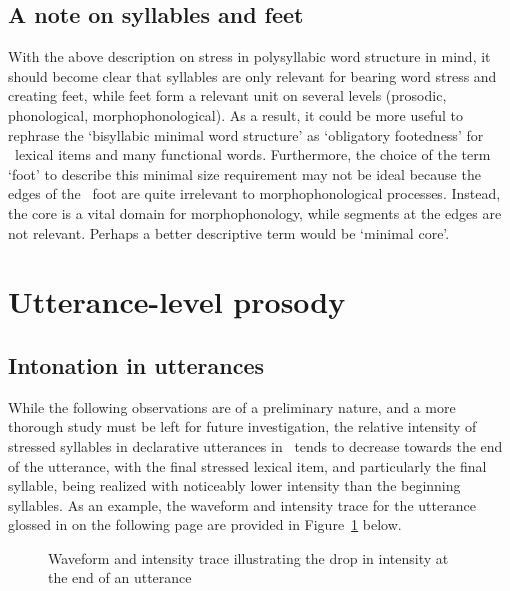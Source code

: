 \subsection{A note on syllables and feet}\label{footedness}
With the above description on stress in polysyllabic word structure in mind, it should become clear that syllables are only relevant for bearing word stress and creating feet, while feet form a relevant unit on several levels (prosodic, phonological, morphophonological). As a result, it could be more useful to rephrase the ‘bisyllabic minimal word structure’ as ‘obligatory footedness’ for \PS\ lexical items and many functional words. Furthermore, the choice of the term ‘foot’ to describe this minimal size requirement may not be ideal because the edges of the \PS\ foot are quite irrelevant to morphophonological processes. Instead, the  core is a vital domain for morphophonology, while segments at the edges are not relevant. Perhaps a better descriptive term would be ‘minimal core’.


\section{Utterance-level prosody}\label{utteranceProsody}

\subsection{Intonation in utterances}\label{utteranceIntonation}
While the following observations are of a preliminary nature, and a more thorough study must be left for future investigation, the relative intensity of stressed syllables in declarative utterances in \PS\ tends to decrease towards the end of the utterance, with the final stressed lexical item, and particularly the final syllable, being realized with noticeably lower intensity than the beginning syllables. As an example, the waveform and intensity trace for the utterance glossed in  on the following page are provided in Figure~\ref{intonationGraphic} below. %
\setlength\fboxrule{0pt}
\begin{figure}[htb]
\caption{Waveform and intensity trace illustrating the drop in intensity at the end of an utterance}\label{intonationGraphic}
\end{figure}

